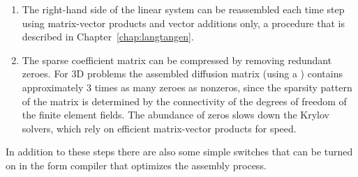\begin{enumerate}
\item The right-hand side of the linear system can be reassembled
  each time step using matrix-vector products and vector additions
  only, a procedure that is described in Chapter~\ref{chap:langtangen}.

\item The sparse coefficient matrix can be compressed by removing
  redundant zeroes. For 3D problems the assembled diffusion matrix
  (using a ) contains approximately 3 times
  as many zeroes as nonzeros, since the sparsity pattern of the
  matrix is determined by the connectivity of the degrees of freedom
  of the finite element fields. The abundance of zeros slows down the
  Krylov solvers, which rely on efficient matrix-vector products for
  speed.

\end{enumerate}
In addition to these steps there are also some simple switches that
can be turned on in the form compiler that optimizes the assembly
process.

